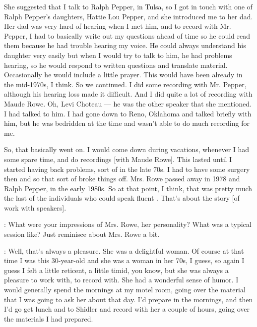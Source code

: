 \documentclass[output=paper]{LSP/langsci}
\begin{document}
She suggested that I talk to Ralph Pepper, in Tulsa, so I got in touch with one of Ralph Pepper's daughters, Hattie Lou Pepper, and she introduced me to her dad. Her dad was very hard of hearing when I met him, and to record with Mr. Pepper, I had to basically write out my questions ahead of time so he could read them because he had trouble hearing my voice. He could always understand his daughter very easily but when I would try to talk to him, he had problems hearing, so he would respond to written questions and translate material. Occasionally he would include a little prayer. This would have been already in the mid-1970s, I think. So we continued. I did some recording with Mr. Pepper, although his hearing loss made it difficult. And I did quite a lot of recording with Maude Rowe. Oh, Levi Choteau --- he was the other speaker that she mentioned. I had talked to him. I had gone down to Reno, Oklahoma and talked briefly with him, but he was bedridden at the time and wasn't able to do much recording for me.

So, that basically went on. I would come down during vacations, whenever I had some spare time, and do recordings [with Maude Rowe]. This lasted until I started having back problems, sort of in the late 70s. I had to have some surgery then and so that sort of broke things off. Mrs. Rowe passed away in 1978 and Ralph Pepper, in the early 1980s. So at that point, I think, that was pretty much the last of the individuals who could speak fluent . That's about the story [of work with  speakers].

:  What were your impressions of Mrs. Rowe, her personality? What was a typical session like? Just reminisce about Mrs. Rowe a bit.

:  Well, that's always a pleasure. She was a delightful woman. Of course at that time I was this 30-year-old and she was a woman in her 70s, I guess, so again I guess I felt a little reticent, a little timid, you know, but she was always a pleasure to work with, to record with. She had a wonderful sense of humor. I would generally spend the mornings at my motel room, going over the material that I was going to ask her about that day. I'd prepare in the mornings, and then I'd go get lunch and to Shidler and record with her a couple of hours, going over the materials I had prepared. 
\end{document}
